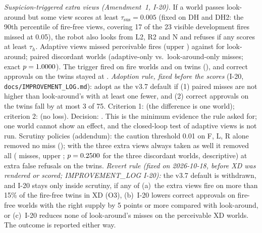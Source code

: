 \documentclass[conference]{IEEEtran}
\newcommand{\tauh}{\tau_{h}}
\begin{document}
\emph{Suspicion-triggered extra views (Amendment~1, I-20).} If a world passes look-around but some view scores at least $\tau_{\mathrm{sus}}=0.005$ (fixed on DH and DH2: the 90th percentile of fire-free views, covering 17 of the 23 visible development fires missed at 0.05), the robot also looks from L2, R2 and N and refuses if any scores at least $\tauh$. Adaptive views missed \WAdaptMiss{} perceivable fires (upper \WAdaptMissUpper) against \WMissLA{} for look-around; paired discordant worlds \WAdaptPaired{} (adaptive-only vs.\ look-around-only misses; exact $p=1.0000$). The trigger fired on \WAdaptTrigFire{} fire worlds and on \WAdaptTrigTwin{} twins (\WAdaptTrigTwinCI), and correct approvals on the twins stayed at \WAdaptTwinCA. \emph{Adoption rule, fixed before the scores} (I-20, \texttt{docs/IMPROVEMENT\_LOG.md}): adopt as the v3.7 default if (1) paired misses are not higher than look-around's with at least one fewer, and (2) correct approvals on the twins fall by at most 3 of 75. Criterion 1: \WAdaptRuleA{} (the difference is one world); criterion 2: \WAdaptRuleB{} (no loss). Decision: \WAdaptAdopt. This is the minimum evidence the rule asked for; one world cannot show an effect, and the closed-loop test of adaptive views is not run. Scrutiny policies (addendum): the caution threshold 0.01 on F, L, R alone removed no miss (\WScrutMissB); with the three extra views always taken as well it removed all (\WScrutMissC{} misses, upper \WScrutMissCUpper; $p=0.2500$ for the three discordant worlds, descriptive) at \WScrutTwinStopC{} extra false refusals on the twins. \emph{Revert rule (fixed on 2026-10-18, before XD was rendered or scored; IMPROVEMENT\_LOG I-20):} the v3.7 default is withdrawn, and I-20 stays only inside scrutiny, if any of (a)~the extra views fire on more than 15\% of the fire-free twins in XD (O3), (b)~I-20 lowers correct approvals on fire-free worlds with the right supply by 5 points or more compared with look-around, or (c)~I-20 reduces none of look-around's misses on the perceivable XD worlds. The outcome is reported either way. 
\end{document}
